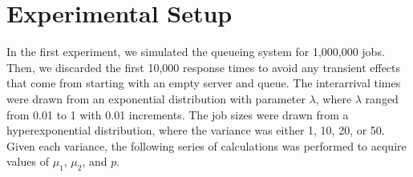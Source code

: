 \documentclass[12pt]{article}
\begin{document}
\section{Experimental Setup}
In the first experiment, we simulated the queueing system for 1,000,000 jobs. Then, we discarded the first 10,000 response times to avoid any transient effects that come from starting with an empty server and queue. The interarrival times were drawn from an exponential distribution with parameter $\lambda$, where $\lambda$ ranged from 0.01 to 1 with 0.01 increments. The job sizes were drawn from a hyperexponential distribution, where the variance was either 1, 10, 20, or 50. Given each variance, the following series of calculations was performed to acquire values of $\mu_1$, $\mu_2$, and $p$. \\
\end{document}
